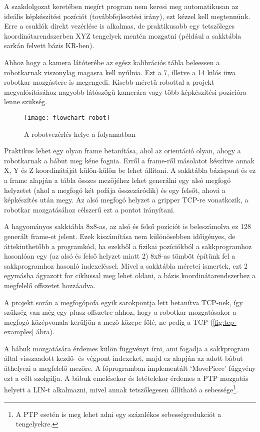 \documentclass[../documentation.tex]{subfiles}
\begin{document}
A szakdolgozat keretében megírt program nem keresi meg automatikusan az ideális képkészítési pozíciót (továbbfejlesztési irány), ezt kézzel kell megtennünk. Erre a csuklók direkt vezérlése is alkalmas, de praktikusabb egy tetszőleges koordinátarendszerben XYZ tengelyek mentén mozgatni (például a sakktábla sarkán felvett bázis KR-ben).

Ahhoz hogy a kamera látóterébe az egész kalibrációs tábla beleessen a robotkarnak viszonylag magasra kell nyúlnia. Ezt a 7, illetve a 14 kilós iiwa robotkar mozgástere is megengedi. Kisebb méretű robottal a projekt megvalósításához nagyobb látószögű kamerára vagy több képkészítési pozícióra lenne szükség.

\begin{figure}[h]
    \centering
    \texttt{[image: flowchart-robot]}
    \caption{A robotvezérlés helye a folyamatban}
    \label{fig:flowchart-robot}
\end{figure}

Praktikus lehet egy olyan frame betanítása, ahol az orientáció olyan, ahogy a robotkarnak a bábut meg kéne fognia. Erről a frame-ről másolatot készítve annak X, Y és Z koordinátáját külön-külön be lehet állítani. A sakktábla bázispont és ez a frame alapján a tábla összes mezőjéhez lehet generálni egy alsó megfogó helyzetet (ahol a megfogó két pofája összezáródik) és egy felsőt, ahová a képkészítés után megy. Az alsó megfogó helyzet a gripper TCP-re vonatkozik, a robotkar mozgatásához célszerű ezt a pontot irányítani.

A hagyományos sakktábla 8x8-as, az alsó és felső pozíciót is beleszámolva ez 128 generált frame-et jelent. Ezek kiszámítása nem különösebben időigényes, de áttekinthetőbb a programkód, ha ezekből a fizikai pozíciókból a sakkprogramhoz hasonlóan egy (az alsó és felső helyzet miatt 2) 8x8-as tömböt építünk fel a sakkprogramhoz hasonló indexeléssel. Mivel a sakktábla méretei ismertek, ezt 2 egymásba ágyazott for ciklussal meg lehet oldani, a bázis koordinátarendszerhez a megfelelő offszetet hozzáadva.

A projekt során a megfogópofa egyik sarokpontja lett betanítva TCP-nek, így szükség van még egy plusz offszetre ahhoz, hogy a robotkar mozgatásakor a megfogó középvonala kerüljön a mező közepe fölé, ne pedig a TCP (\ref{fig:tcp-examples} ábra).

A bábuk mozgatására érdemes külön függvényt írni, ami fogadja a sakkprogram által visszaadott kezdő- és végpont indexeket, majd ez alapján az adott bábut áthelyezi a megfelelő mezőre. A főprogramban implementált `MovePiece' függvény ezt a célt szolgálja. A bábuk emelésekor és letételekor érdemes a PTP mozgatás helyett a LIN-t alkalmazni, mivel annak tetszőlegesen állítható a sebessége\footnote{A PTP esetén is meg lehet adni egy százalékos sebességredukciót a tengelyekre.}.
\end{document}

